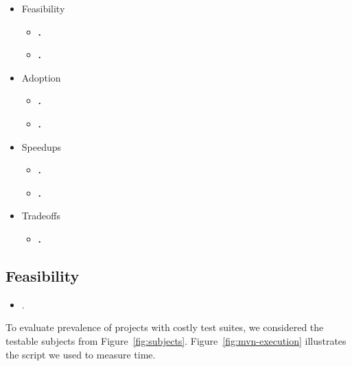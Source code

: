\begin{itemize}
\item Feasibility
  \begin{itemize}
  \item \textbf{\numRQFeasibilityOne.} \RQFeasibilityOne
  \item \textbf{\numRQFeasibilityTwo.} \RQFeasibilityTwo    
  \end{itemize}
\item Adoption
  \begin{itemize}
  \item \textbf{\numRQAdoptionOne.} \RQAdoptionOne    
  \item \textbf{\numRQAdoptionTwo.} \RQAdoptionTwo
  \end{itemize}
\item Speedups
  \begin{itemize}
  \item \textbf{\numRQSpeedupOne.} \RQSpeedupOne
  \item \textbf{\numRQSpeedupTwo.} \RQSpeedupTwo
  \end{itemize}      
\item Tradeoffs
  \begin{itemize}
  \item \textbf{\numRQIssuesOne.} \RQIssuesOne    
  \end{itemize}
\end{itemize}


\subsection{Feasibility}
\label{sec:rqA}
\label{sec:rqB}

\begin{itemize}
  \item \numRQFeasibilityOne{}. \textbf{\RQFeasibilityOne}
\end{itemize}

To evaluate prevalence of projects with costly test suites, we
considered the \numSubjs{} testable subjects from
Figure~\ref{fig:subjects}.  Figure~\ref{fig:mvn-execution} illustrates
the script we used to measure time.

